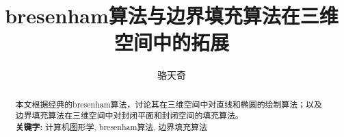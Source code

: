\documentclass{article}
\title{bresenham算法与边界填充算法在三维空间中的拓展}
\author{骆天奇}
\date{}
\begin{document}
\maketitle
\begin{abstract}
    本文根据经典的bresenham算法，讨论其在三维空间中对直线和椭圆的绘制算法；以及边界填充算法在三维空间中对封闭平面和封闭空间的填充算法。\\
    \textbf{关键字:} 计算机图形学, bresenham算法, 边界填充算法
\end{abstract}

%

\end{document}
